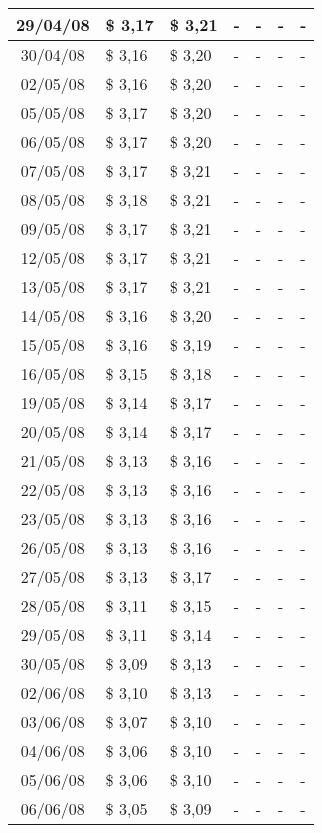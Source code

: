 \begin{center}
\begin{longtable}{|c|p{1.5cm}|p{1.5cm}|p{1.5cm}|p{1.5cm}|p{1.5cm}|p{1.5cm}|}
29/04/08 & \$ 3,17 & \$ 3,21 & - & - & - & - \\ \hline
30/04/08 & \$ 3,16 & \$ 3,20 & - & - & - & - \\ \hline
02/05/08 & \$ 3,16 & \$ 3,20 & - & - & - & - \\ \hline
05/05/08 & \$ 3,17 & \$ 3,20 & - & - & - & - \\ \hline
06/05/08 & \$ 3,17 & \$ 3,20 & - & - & - & - \\ \hline
07/05/08 & \$ 3,17 & \$ 3,21 & - & - & - & - \\ \hline
08/05/08 & \$ 3,18 & \$ 3,21 & - & - & - & - \\ \hline
09/05/08 & \$ 3,17 & \$ 3,21 & - & - & - & - \\ \hline
12/05/08 & \$ 3,17 & \$ 3,21 & - & - & - & - \\ \hline
13/05/08 & \$ 3,17 & \$ 3,21 & - & - & - & - \\ \hline
14/05/08 & \$ 3,16 & \$ 3,20 & - & - & - & - \\ \hline
15/05/08 & \$ 3,16 & \$ 3,19 & - & - & - & - \\ \hline
16/05/08 & \$ 3,15 & \$ 3,18 & - & - & - & - \\ \hline
19/05/08 & \$ 3,14 & \$ 3,17 & - & - & - & - \\ \hline
20/05/08 & \$ 3,14 & \$ 3,17 & - & - & - & - \\ \hline
21/05/08 & \$ 3,13 & \$ 3,16 & - & - & - & - \\ \hline
22/05/08 & \$ 3,13 & \$ 3,16 & - & - & - & - \\ \hline
23/05/08 & \$ 3,13 & \$ 3,16 & - & - & - & - \\ \hline
26/05/08 & \$ 3,13 & \$ 3,16 & - & - & - & - \\ \hline
27/05/08 & \$ 3,13 & \$ 3,17 & - & - & - & - \\ \hline
28/05/08 & \$ 3,11 & \$ 3,15 & - & - & - & - \\ \hline
29/05/08 & \$ 3,11 & \$ 3,14 & - & - & - & - \\ \hline
30/05/08 & \$ 3,09 & \$ 3,13 & - & - & - & - \\ \hline
02/06/08 & \$ 3,10 & \$ 3,13 & - & - & - & - \\ \hline
03/06/08 & \$ 3,07 & \$ 3,10 & - & - & - & - \\ \hline
04/06/08 & \$ 3,06 & \$ 3,10 & - & - & - & - \\ \hline
05/06/08 & \$ 3,06 & \$ 3,10 & - & - & - & - \\ \hline
06/06/08 & \$ 3,05 & \$ 3,09 & - & - & - & - \\ \hline

\end{longtable}
\end{center}
